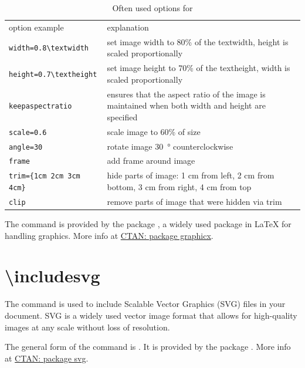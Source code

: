 \begin{table}\centering
    \caption{Often used options for }
    \renewcommand{\arraystretch}{1.3} %
    \begin{tabular}{lp{7.5cm}}
    \toprule
    option example                                   & explanation \\[+1ex]
    \verb|width=0.8\textwidth|                       & set image width to 80\% of the textwidth, height is scaled proportionally\\
    \verb|height=0.7\textheight|                     & set image height to 70\% of the textheight, width is scaled proportionally\\
    \verb|keepaspectratio|                           &  ensures that the aspect ratio of the image is maintained when both width and height are specified\\
    \verb|scale=0.6|                                 & scale image to 60\% of size\\
    \verb|angle=30|                                  & rotate image \qty{30}{\degree} counterclockwise\\
    \verb|frame|                                     & add frame around image\\
    \verb|trim={1cm 2cm 3cm 4cm}|                    & hide parts of image: 1 cm from left, 2 cm from bottom, 3 cm from right, 4 cm from top\\
     \verb|clip|                                     & remove parts of image that were hidden via trim\\
    \bottomrule
    \end{tabular}\label{tab:includegraphicsoptions}
\end{table}

The command is provided by the package , a widely used package in LaTeX for handling graphics. More info at \href{https://ctan.org/pkg/graphicx?lang=EN}{CTAN: package graphicx}.

\section{\textbackslash includesvg}
The  command is used to include Scalable Vector Graphics (SVG) files in your document. SVG is a widely used vector image format that allows for high-quality images at any scale without loss of resolution.

The general form of the command is . It is provided by the package . More info at \href{https://ctan.org/pkg/svg?lang=EN}{CTAN: package svg}.

